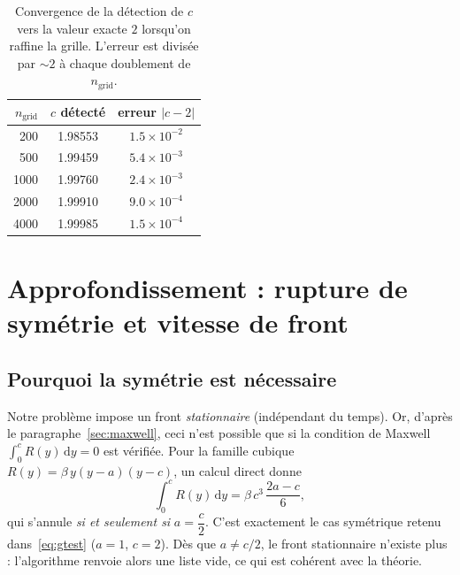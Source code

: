 \documentclass[11pt,a4paper]{article}
\theoremstyle{plain}
\theoremstyle{remark}
\newcommand{\dd}{\,\mathrm{d}}
\begin{document}
\begin{table}[h]
  \centering
  \renewcommand{\arraystretch}{1.2}
  \begin{tabular}{rcc}
    \toprule
    $n_{\text{grid}}$ & $c$ détecté & erreur $|c-2|$\\
    \midrule
    200   & 1.98553 & $1.5\times10^{-2}$\\
    500   & 1.99459 & $5.4\times10^{-3}$\\
    1000  & 1.99760 & $2.4\times10^{-3}$\\
    2000  & 1.99910 & $9.0\times10^{-4}$\\
    4000  & 1.99985 & $1.5\times10^{-4}$\\
    \bottomrule
  \end{tabular}
  \caption{Convergence de la détection de $c$ vers la valeur exacte $2$
  lorsqu'on raffine la grille. L'erreur est divisée par $\sim2$ à chaque
  doublement de $n_{\text{grid}}$.}
  \label{tab:conv}
\end{table}

\section{Approfondissement : rupture de symétrie et vitesse de front}
\label{sec:nonsym}

\subsection{Pourquoi la symétrie est nécessaire}
Notre problème impose un front \emph{stationnaire} (indépendant du temps). Or,
d'après le paragraphe~\ref{sec:maxwell}, ceci n'est possible que si la condition
de Maxwell $\int_0^c R(y)\dd y=0$ est vérifiée. Pour la famille cubique
$R(y)=\beta\,y(y-a)(y-c)$, un calcul direct donne
\[
  \int_0^c R(y)\dd y=\beta\,c^3\,\frac{2a-c}{6},
\]
qui s'annule \emph{si et seulement si} $a=\dfrac{c}{2}$. C'est exactement le cas
symétrique retenu dans~\eqref{eq:gtest} ($a=1$, $c=2$). Dès que $a\neq c/2$, le
front stationnaire n'existe plus : l'algorithme renvoie alors une liste vide,
ce qui est cohérent avec la théorie.
\end{document}
